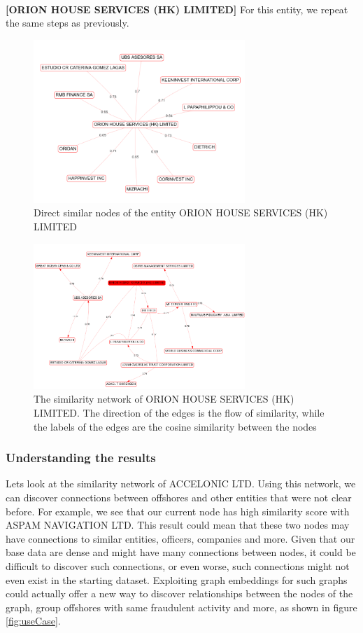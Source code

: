 \documentclass[sigconf, nonacm]{acmart}
\begin{document}
\\\textbf{[ORION HOUSE SERVICES (HK) LIMITED]} For this entity, we repeat the same steps as previously.
\begin{figure}[htp]
    \centering
    \includegraphics[width=8cm]{figures/orion_star.png}
    \caption{Direct similar nodes of the entity ORION HOUSE SERVICES (HK) LIMITED}
    \label{fig:galaxy}
\end{figure}
\begin{figure}[htp]
    \centering
    \includegraphics[width=8cm]{figures/orion_network_depth3.png}
    \caption{The similarity network of ORION HOUSE SERVICES (HK) LIMITED. The direction of the edges is the flow of similarity, while the labels of the edges are the cosine similarity between the nodes}
    \label{fig:galaxy}
\end{figure}

\subsubsection{Understanding the results}
Lets look at the similarity network of ACCELONIC LTD. Using this network, we can discover connections between offshores and other entities that were not clear before. For example, we see that our current node has high similarity score with ASPAM NAVIGATION LTD. This result could mean that these two nodes may have connections to similar entities, officers, companies and more. Given that our base data are dense and might have many connections between nodes, it could be difficult to discover such connections, or even worse, such connections might not even exist in the starting dataset. Exploiting graph embeddings for such graphs could actually offer a new way to discover relationships between the nodes of the graph, group offshores with same fraudulent activity and more, as shown in figure \ref{fig:useCase}.
\end{document}
